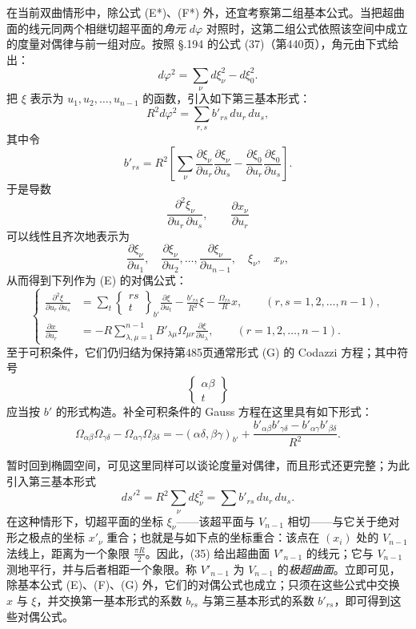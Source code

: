 在当前双曲情形中，除公式 (E*)、(F*) 外，还宜考察第二组基本公式。当把超曲面的线元同两个相继切超平面的\emph{角元} $d\varphi$ 对照时，这第二组公式依照该空间中成立的度量对偶律与前一组对应。按照 \S.194 的公式 (37)（第440页），角元由下式给出：
\[
d\varphi^2=\sum_\nu d\xi_\nu^2-d\xi_0^2.
\]
把 $\xi$ 表示为 $u_1,u_2,\ldots,u_{n-1}$ 的函数，引入如下第三基本形式：
\[
\tag{33}
R^2d\varphi^2=\sum_{r,s}b'_{rs}\,du_r\,du_s,
\]
其中令
\[
\tag{34}
b'_{rs}=R^2\left[
\sum_\nu\frac{\partial\xi_\nu}{\partial u_r}\frac{\partial\xi_\nu}{\partial u_s}
-\frac{\partial\xi_0}{\partial u_r}\frac{\partial\xi_0}{\partial u_s}\right].
\]
于是导数
\[
\frac{\partial^2\xi_\nu}{\partial u_r\,\partial u_s},\qquad
\frac{\partial x_\nu}{\partial u_r}
\]
可以线性且齐次地表示为
\[
\frac{\partial\xi_\nu}{\partial u_1},\quad
\frac{\partial\xi_\nu}{\partial u_2},\ldots,
\frac{\partial\xi_\nu}{\partial u_{n-1}},\quad \xi_\nu,\quad x_\nu,
\]
从而得到下列作为 (E) 的对偶公式：
\[
\tag{E**}
\left\{
\begin{aligned}
\frac{\partial^2\xi}{\partial u_r\,\partial u_s}
&=\sum_t\left\{\begin{matrix}rs\\ t\end{matrix}\right\}_{b'}
\frac{\partial\xi}{\partial u_t}
-\frac{b'_{rs}}{R^2}\xi-\frac{\Omega_{rs}}{R}x,
\qquad (r,s=1,2,\ldots,n-1),\\
\frac{\partial x}{\partial u_r}
&=-R\sum_{\lambda,\mu=1}^{n-1}B'_{\lambda\mu}\Omega_{\mu r}
\frac{\partial\xi}{\partial u_\lambda},
\qquad (r=1,2,\ldots,n-1).
\end{aligned}\right.
\]
至于可积条件，它们仍归结为保持第485页通常形式 (G) 的 Codazzi 方程；其中符号
\[
\left\{\begin{matrix}\alpha\beta\\ t\end{matrix}\right\}
\]
应当按 $b'$ 的形式构造。补全可积条件的 Gauss 方程在这里具有如下形式：
\[
\tag{F**}
\Omega_{\alpha\beta}\Omega_{\gamma\delta}-\Omega_{\alpha\gamma}\Omega_{\beta\delta}
=-(\alpha\delta,\beta\gamma)_{b'}+
\frac{b'_{\alpha\beta}b'_{\gamma\delta}-b'_{\alpha\gamma}b'_{\beta\delta}}{R^2}.
\]

暂时回到椭圆空间，可见这里同样可以谈论度量对偶律，而且形式还更完整；为此引入第三基本形式
\[
\tag{35}
ds'^2=R^2\sum_\nu d\xi_\nu^2=\sum b'_{rs}\,du_r\,du_s.
\]
在这种情形下，切超平面的坐标 $\xi_\nu$——该超平面与 $V_{n-1}$ 相切——与它关于绝对形之极点的坐标 $x'_\nu$ 重合；也就是与如下点的坐标重合：该点在 $(x_i)$ 处的 $V_{n-1}$ 法线上，距离为一个象限 $\frac{\pi R}{2}$。因此，(35) 给出超曲面 $V'_{n-1}$ 的线元；它与 $V_{n-1}$ 测地平行，并与后者相距一个象限。称 $V'_{n-1}$ 为 $V_{n-1}$ 的\emph{极超曲面}。立即可见，除基本公式 (E)、(F)、(G) 外，它们的对偶公式也成立；只须在这些公式中交换 $x$ 与 $\xi$，并交换第一基本形式的系数 $b_{rs}$ 与第三基本形式的系数 $b'_{rs}$，即可得到这些对偶公式。

